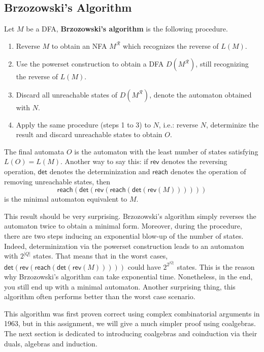 \documentclass[main.tex]{subfiles}
\begin{document}
\subsection{Brzozowski's Algorithm}\label{sec-brzozowski}
\begin{defn}\label{defn-brzozowski}
    Let $M$ be a DFA, \textbf{Brzozowski's algorithm} is the following procedure.
    \begin{enumerate}
        \item Reverse $M$ to obtain an NFA $M^{\mathcal{R}}$ which recognizes the reverse of $L(M)$.
        \item Use the powerset construction to obtain a DFA $D(M^{\mathcal{R}})$, still recognizing the reverse of $L(M)$.
        \item Discard all unreachable states of $D(M^{\mathcal{R}})$, denote the automaton obtained with $N$.
        \item Apply the same procedure (steps 1 to 3) to $N$, i.e.: reverse $N$, determinize the result and discard unreachable states to obtain $O$. 
    \end{enumerate}
\end{defn}
\begin{prop}
    The final automata $O$ is the automaton with the least number of states satisfying $L(O) = L(M)$. Another way to say this: if $\textsf{rev}$ denotes the reversing operation, $\textsf{det}$ denotes the determinization and $\textsf{reach}$ denotes the operation of removing unreachable states, then \[\textsf{reach}(\textsf{det}(\textsf{rev}(\textsf{reach}(\textsf{det}(\textsf{rev}(M))))))\] is the minimal automaton equivalent to $M$.
\end{prop}
\begin{rem}
    This result should be very surprising. Brzozowski's algorithm simply reverses the automaton twice to obtain a minimal form. Moreover, during the procedure, there are two steps inducing an exponential blow-up of the number of states. Indeed, determinization via the powerset construction leads to an automaton with $2^{|Q|}$ states. That means that in the worst cases, $\textsf{det}(\textsf{rev}(\textsf{reach}(\textsf{det}(\textsf{rev}(M)))))$ could have $2^{2^{|Q|}}$ states. This is the reason why Brzozowski's algorithm can take exponential time. Nonetheless, in the end, you still end up with a minimal automaton. Another surprising thing, this algorithm often performs better than the worst case scenario.
\end{rem}
This algorithm was first proven correct using complex combinatorial arguments in 1963, but in this assignment, we will give a much simpler proof using coalgebras. The next section is dedicated to introducing coalgebras and coinduction via their duals, algebras and induction.
\end{document}
